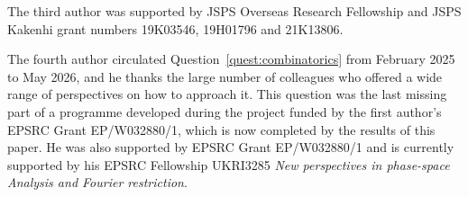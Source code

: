 \documentclass[11pt,reqno]{amsart}
\numberwithin{equation}{section}
\begin{document}
The third author was supported by JSPS Overseas Research Fellowship and JSPS Kakenhi grant numbers 19K03546, 19H01796 and 21K13806.

The fourth author circulated Question~\ref{quest:combinatorics} from February 2025 to May 2026, and he thanks the large number of colleagues who offered a wide range of perspectives on how to approach it. This question was the last missing part of a programme developed during the project funded by the first author's EPSRC Grant EP/W032880/1, which is now completed by the results of this paper. He was also supported by EPSRC Grant EP/W032880/1 and is currently supported by his EPSRC Fellowship UKRI3285 \textit{New perspectives in phase-space Analysis and Fourier restriction}.
 



\end{document}
